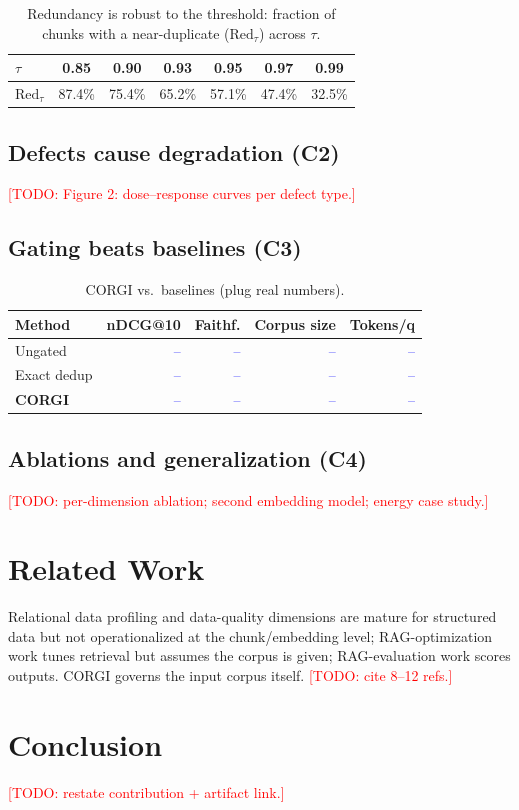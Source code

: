\documentclass[conference]{IEEEtran}
\newcommand{\todo}[1]{\textcolor{red}{[TODO: #1]}}
\newcommand{\num}[1]{\textcolor{blue}{#1}} %
\begin{document}
\begin{table}[t]
\caption{Redundancy is robust to the threshold: fraction of chunks with a near-duplicate
($\mathrm{Red}_\tau$) across $\tau$.}
\label{tab:sweep}
\centering
\begin{tabular}{@{}lcccccc@{}}
\toprule
$\tau$ & 0.85 & 0.90 & 0.93 & 0.95 & 0.97 & 0.99 \\
\midrule
$\mathrm{Red}_\tau$ & 87.4\% & 75.4\% & 65.2\% & 57.1\% & 47.4\% & 32.5\% \\
\bottomrule
\end{tabular}
\end{table}

\subsection{Defects cause degradation (C2)}
\todo{Figure 2: dose--response curves per defect type.}

\subsection{Gating beats baselines (C3)}
\begin{table}[t]
\caption{CORGI vs.\ baselines (plug real numbers).}
\label{tab:main}
\centering
\begin{tabular}{@{}lrrrr@{}}
\toprule
Method & nDCG@10 & Faithf. & Corpus size & Tokens/q \\
\midrule
Ungated & \num{--} & \num{--} & \num{--} & \num{--} \\
Exact dedup & \num{--} & \num{--} & \num{--} & \num{--} \\
\textbf{CORGI} & \num{--} & \num{--} & \num{--} & \num{--} \\
\bottomrule
\end{tabular}
\end{table}

\subsection{Ablations and generalization (C4)}
\todo{per-dimension ablation; second embedding model; energy case study.}

\section{Related Work}\label{sec:related}
Relational data profiling and data-quality dimensions are mature for structured data but
not operationalized at the chunk/embedding level; RAG-optimization work tunes retrieval but
assumes the corpus is given; RAG-evaluation work scores outputs. CORGI governs the input
corpus itself. \todo{cite 8--12 refs.}

\section{Conclusion}\label{sec:conclusion}
\todo{restate contribution + artifact link.}



\end{document}
